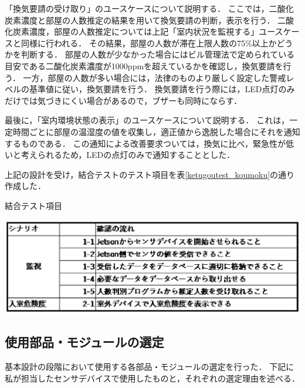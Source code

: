 「換気要請の受け取り」のユースケースについて説明する．
ここでは，二酸化炭素濃度と部屋の人数推定の結果を用いて換気要請の判断，表示を行う．
二酸化炭素濃度，部屋の人数推定については上記「室内状況を監視する」ユースケースと同様に行われる．
その結果，部屋の人数が滞在上限人数の75\%以上かどうかを判断する．
部屋の人数が少なかった場合にはビル管理法で定められている目安である二酸化炭素濃度が1000ppmを超えているかを確認し，換気要請を行う．
一方，部屋の人数が多い場合には，法律のものより厳しく設定した警戒レベルの基準値に従い，換気要請を行う．
換気要請を行う際には，LED点灯のみだけでは気づきにくい場合があるので，ブザーも同時にならす．

最後に，「室内環境状態の表示」のユースケースについて説明する．
これは，一定時間ごとに部屋の温湿度の値を収集し，適正値から逸脱した場合にそれを通知するものである．
この通知による改善要求ついては，換気に比べ，緊急性が低いと考えられるため，LEDの点灯のみで通知することとした．

上記の設計を受け，結合テストのテスト項目を表\ref{ketugoutest_koumoku}の通り作成した．
\begin{table}[htbp]
    \centering
    \caption{結合テスト項目}
    \label{ketugoutest_koumoku}
    \includegraphics[width = 15cm]{./picture/ketugoutest_koumoku.eps}
\end{table}

\subsection{使用部品・モジュールの選定}
基本設計の段階において使用する各部品・モジュールの選定を行った．
下記に私が担当したセンサデバイスで使用したものと，それぞれの選定理由を述べる．

